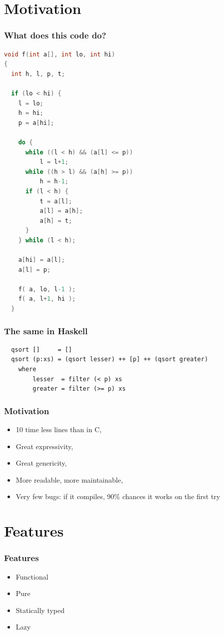 \documentclass{beamer}
\begin{document}
\section{Motivation}

\begin{frame}[fragile]
\frametitle{What does this code do?}

\begin{lstlisting}[language=C, basicstyle=\tiny]
void f(int a[], int lo, int hi) 
{
  int h, l, p, t;

  if (lo < hi) {
    l = lo;
    h = hi;
    p = a[hi];

    do {
      while ((l < h) && (a[l] <= p)) 
          l = l+1;
      while ((h > l) && (a[h] >= p))
          h = h-1;
      if (l < h) {
          t = a[l];
          a[l] = a[h];
          a[h] = t;
      }
    } while (l < h);

    a[hi] = a[l];
    a[l] = p;

    f( a, lo, l-1 );
    f( a, l+1, hi );
  }
\end{lstlisting}

\end{frame}

\begin{frame}[fragile]
\frametitle{The same in Haskell}

\begin{lstlisting}
  qsort []     = []
  qsort (p:xs) = (qsort lesser) ++ [p] ++ (qsort greater)
    where
        lesser  = filter (< p) xs
        greater = filter (>= p) xs

\end{lstlisting}

\end{frame}

\begin{frame}
\frametitle{Motivation}

 \begin{itemize}
  \item 10 time less lines than in C,
  \item Great expressivity,
  \item Great genericity,
  \item More readable, more maintainable,
  \item Very few bugs: if it compiles, 90\% chances it works on the first try
 \end{itemize}

\end{frame}


\section{Features}
\begin{frame}
\frametitle{Features}

 \begin{itemize}
  \item Functional
  \item Pure
  \item Statically typed
  \item Lazy
 \end{itemize}

\end{frame}
\end{document}

